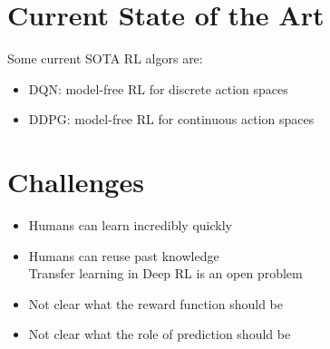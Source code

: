 \section{Current State of the Art}
Some current \ac{SOTA} \ac{RL} \ac{algor}s are:
\begin{itemize}
	\item \ac{DQN}: model-free \ac{RL} for discrete action spaces \cite{mnih2015human}
	\item \ac{DDPG}: model-free \ac{RL} for continuous action spaces \cite{lillicrap2015continuous}
\end{itemize}

\section{Challenges}
\begin{itemize}
	\item Humans can learn incredibly quickly
	\item Humans can reuse past knowledge\\
	Transfer learning in Deep \ac{RL} is an open problem
	\item Not clear what the reward function should be
	\item Not clear what the role of prediction should be
\end{itemize}

